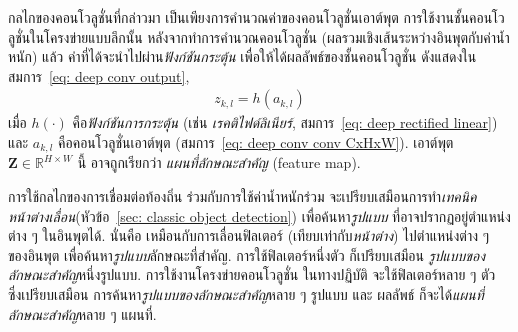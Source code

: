 กลไกของคอนโวลูชั่นที่กล่าวมา เป็นเพียงการคำนวณค่าของคอนโวลูชั่นเอาต์พุต
การใช้งานชั้นคอนโวลูชั่นในโครงข่ายแบบลึกนั้น 
หลังจากทำการคำนวณคอนโวลูชั่น (ผลรวมเชิงเส้นระหว่างอินพุตกับค่าน้ำหนัก)
แล้ว
ค่าที่ได้จะนำไปผ่าน\textit{ฟังก์ชันกระตุ้น} เพื่อให้ได้ผลลัพธ์ของชั้นคอนโวลูชั่น ดังแสดงในสมการ~\ref{eq: deep conv output},
\begin{eqnarray}
z_{k,l} = h(a_{k,l})
\label{eq: deep conv output}
\end{eqnarray}
เมื่อ $h(\cdot)$ คือ\textit{ฟังก์ชันการกระตุ้น} (เช่น \textit{เรคติไฟด์ลิเนียร์}, สมการ~\ref{eq: deep rectified linear})
และ $a_{k,l}$ คือคอนโวลูชั่นเอาต์พุต (สมการ~\ref{eq: deep conv conv CxHxW}).
เอาต์พุต $\bm{Z} \in \mathbb{R}^{H \times W}$ นี้
อาจถูกเรียกว่า \textit{แผนที่ลักษณะสำคัญ} (feature map).

การใช้กลไกของการเชื่อมต่อท้องถิ่น ร่วมกับการใช้ค่าน้ำหนักร่วม จะเปรียบเสมือนการทำ\textit{เทคนิคหน้าต่างเลื่อน}(หัวข้อ~\ref{sec: classic object detection})
เพื่อค้นหา\textit{รูปแบบ}
ที่อาจปรากฏอยู่ตำแหน่งต่าง ๆ ในอินพุตได้.
นั่นคือ เหมือนกับการเลื่อนฟิลเตอร์ (เทียบเท่ากับ\textit{หน้าต่าง}) ไปตำแหน่งต่าง ๆ ของอินพุต เพื่อค้นหา\textit{รูปแบบ}ลักษณะที่สำคัญ.
การใช้ฟิลเตอร์หนึ่งตัว ก็เปรียบเสมือน \textit{รูปแบบของลักษณะสำคัญ}หนึ่งรูปแบบ.
การใช้งานโครงข่ายคอนโวลูชั่น
ในทางปฏิบัติ จะใช้ฟิลเตอร์หลาย ๆ ตัว ซึ่งเปรียบเสมือน
การค้นหา\textit{รูปแบบของลักษณะสำคัญ}หลาย ๆ รูปแบบ
และ ผลลัพธ์ ก็จะได้\textit{แผนที่ลักษณะสำคัญ}หลาย ๆ แผนที่.

